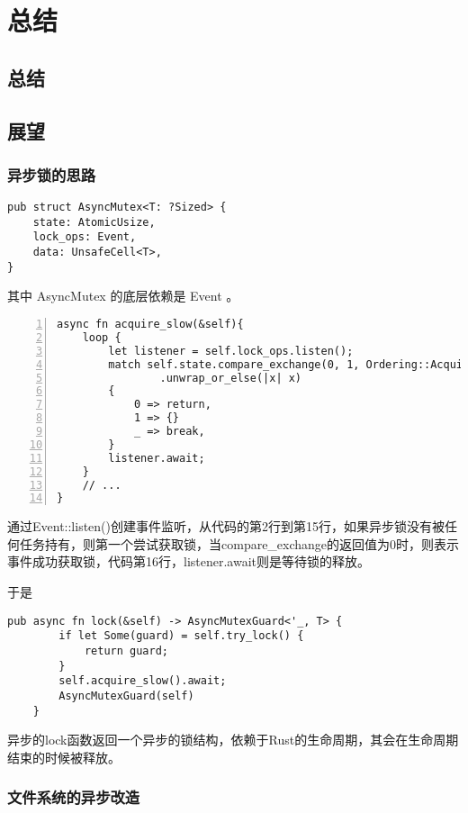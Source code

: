 \chapter{总结}
\label{chap:Summary}
\section{总结}

\section{展望}
\subsection{异步锁的思路}

\begin{lstlisting}[caption=异步锁结构]
pub struct AsyncMutex<T: ?Sized> {
    state: AtomicUsize,
    lock_ops: Event,
    data: UnsafeCell<T>,
}
\end{lstlisting}

其中 AsyncMutex 的底层依赖是 Event 。

\begin{lstlisting}[caption=异步锁的工作机制, numbers=left, label=asyncmutex]
async fn acquire_slow(&self){
    loop {
        let listener = self.lock_ops.listen();
        match self.state.compare_exchange(0, 1, Ordering::Acquire, Ordering::Acquire)
                .unwrap_or_else(|x| x)
        {
            0 => return,
            1 => {}
            _ => break,
        }
        listener.await;
    }
    // ...
}
\end{lstlisting}

通过Event::listen()创建事件监听，从代码的第2行到第15行，如果异步锁没有被任何任务持有，则第一个尝试获取锁，当compare\_exchange的返回值为0时，则表示事件成功获取锁，代码第16行，listener.await则是等待锁的释放。 

于是  
\begin{lstlisting}[caption = 异步锁]
pub async fn lock(&self) -> AsyncMutexGuard<'_, T> {
        if let Some(guard) = self.try_lock() {
            return guard;
        }
        self.acquire_slow().await;
        AsyncMutexGuard(self)
    }
\end{lstlisting}

异步的lock函数返回一个异步的锁结构，依赖于Rust的生命周期，其会在生命周期结束的时候被释放。


\subsection{文件系统的异步改造}

